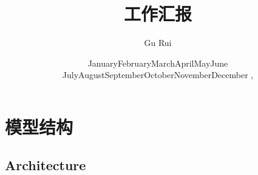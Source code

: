 \documentclass[CJK,aspectratio=169]{beamer}  %
\begin{document}
	
	\title{工作汇报}
	\author[Gu Rui (LZU)]{Gu Rui }
	
	\newcommand{\monthname}[1][\the\month]{%
		\ifcase#1\or
		January\or February\or March\or April\or May\or June\or
		July\or August\or September\or October\or November\or December\fi}
		
	\renewcommand{\today}{\monthname[\the\month] \the\day, \the\year}
	\renewcommand{\figurename}{Figure}
	\renewcommand{\tablename}{Table}
	\renewcommand{\refname}{References}
	\date{\today}
	
	\begin{frame}
		\titlepage
	\end{frame}
	
	\begin{frame}
		\begin{multicols}{2}
			\small \tableofcontents
		\end{multicols}
	\end{frame}
	
%		
%			
	
	\section{模型结构}
	
	\subsection{Architecture}
	
\end{document}
